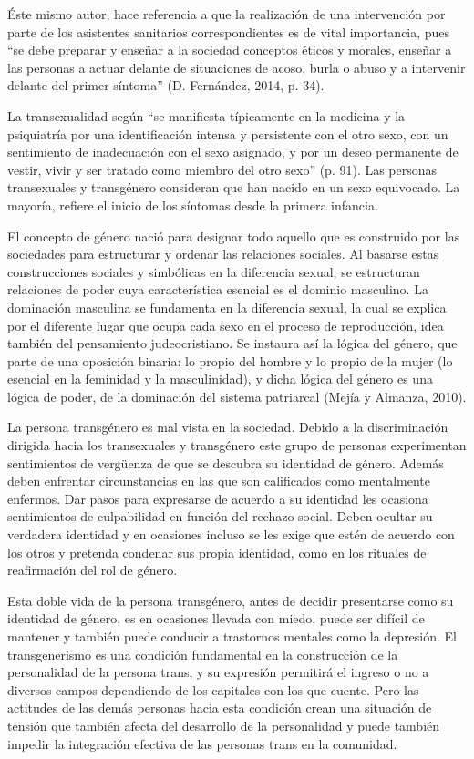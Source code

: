 Éste mismo autor, hace referencia a que la realización de una intervención por
parte de los asistentes sanitarios correspondientes es de vital importancia,
pues “se debe preparar y enseñar a la sociedad conceptos éticos y morales,
enseñar a las personas a actuar delante de situaciones de acoso, burla o abuso y
a intervenir delante del primer síntoma” (D. Fernández, 2014, p. 34).

La transexualidad según \textcite{GomezGil2006} “se manifiesta típicamente en la
medicina y la psiquiatría por una identificación intensa y persistente con el
otro sexo, con un sentimiento de inadecuación con el sexo asignado, y por un
deseo permanente de vestir, vivir y ser tratado como miembro del otro sexo” (p.
91). Las personas transexuales y transgénero consideran que han nacido en un
sexo equivocado. La mayoría, refiere el inicio de los síntomas desde la primera
infancia.

El concepto de género nació para designar todo aquello que es construido por las
sociedades para estructurar y ordenar las relaciones sociales. Al basarse estas
construcciones sociales y simbólicas en la diferencia sexual, se estructuran
relaciones de poder cuya característica esencial es el dominio masculino. La
dominación masculina se fundamenta en la diferencia sexual, la cual se explica
por el diferente lugar que ocupa cada sexo en el proceso de reproducción, idea
también del pensamiento judeocristiano. Se instaura así la lógica del género,
que parte de una oposición binaria: lo propio del hombre y lo propio de la mujer
(lo esencial en la feminidad y la masculinidad), y dicha lógica del género es
una lógica de poder, de la dominación del sistema patriarcal (Mejía y Almanza,
2010).

La persona transgénero es mal vista en la sociedad. Debido a la discriminación
dirigida hacia los transexuales y transgénero este grupo de personas
experimentan sentimientos de vergüenza de que se descubra su identidad de
género. Además deben enfrentar circunstancias en las que son calificados como
mentalmente enfermos. Dar pasos para expresarse de acuerdo a su identidad les
ocasiona sentimientos de culpabilidad en función del rechazo social. Deben
ocultar su verdadera identidad y en ocasiones incluso se les exige que estén de
acuerdo con los otros y pretenda condenar sus propia identidad,
como en los rituales de reafirmación del rol de género.

Esta doble vida de la persona transgénero, antes de decidir presentarse como su
identidad de género, es en ocasiones llevada con miedo, puede ser difícil de
mantener y también puede conducir a trastornos mentales como la depresión. El
transgenerismo es una condición fundamental en la construcción de la
personalidad de la persona trans, y su expresión permitirá el ingreso o no a
diversos campos dependiendo de los capitales con los que cuente. Pero las
actitudes de las demás personas hacia esta condición crean una situación de
tensión que también afecta del desarrollo de la personalidad y puede también
impedir la integración efectiva de las personas trans en la comunidad.

